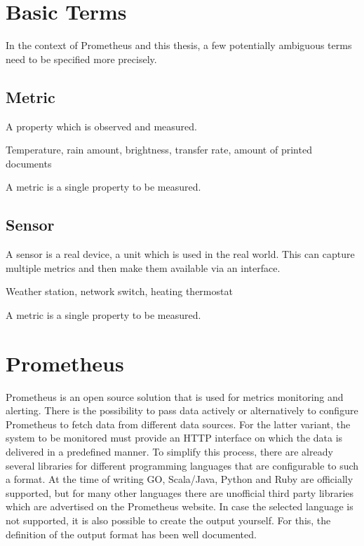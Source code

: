 \section{Basic Terms}
In the context of Prometheus and this thesis, a few potentially ambiguous terms need to be specified more precisely.
\subsection{Metric}
A property which is observed and measured.
\begin{Beispiel}
	Temperature, rain amount, brightness, transfer rate, amount of printed documents
\end{Beispiel}
\begin{Definition}
	A metric is a single property to be measured.
\end{Definition}
\subsection{Sensor}
A sensor is a real device, a unit which is used in the real world. This can capture multiple metrics and then make them available via an interface.
\begin{Beispiel}
	Weather station, network switch, heating thermostat
\end{Beispiel}
\begin{Definition}
	A metric is a single property to be measured.
\end{Definition}

\section{Prometheus}
Prometheus is an open source solution that is used for metrics monitoring and alerting. There is the possibility to pass data actively or alternatively to configure Prometheus to fetch data from different data sources. For the latter variant, the system to be monitored must provide an HTTP interface on which the data is delivered in a predefined manner. To simplify this process, there are already several libraries for different programming languages that are configurable to such a format. At the time of writing GO, Scala/Java, Python and Ruby are officially supported, but for many other languages there are unofficial third party libraries which are advertised on the Prometheus website. In case the selected language is not supported, it is also possible to create the output yourself. For this, the definition of the output format has been well documented.
